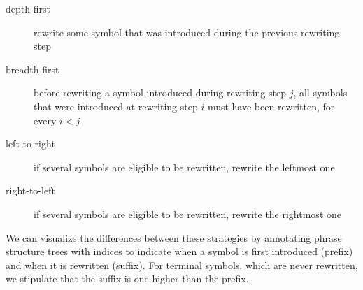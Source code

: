 %
\begin{description}
    \item[depth-first] rewrite some symbol that was introduced during the previous rewriting step
    \item[breadth-first] before rewriting a symbol introduced during rewriting step $j$, all symbols that were introduced at rewriting step $i$ must have been rewritten, for every $i < j$
    \item[left-to-right] if several symbols are eligible to be rewritten, rewrite the leftmost one
    \item[right-to-left] if several symbols are eligible to be rewritten, rewrite the rightmost one
\end{description}

We can visualize the differences between these strategies by annotating phrase structure trees with indices to indicate when a symbol is first introduced (prefix) and when it is rewritten (suffix).
For terminal symbols, which are never rewritten, we stipulate that the suffix is one higher than the prefix.
%
